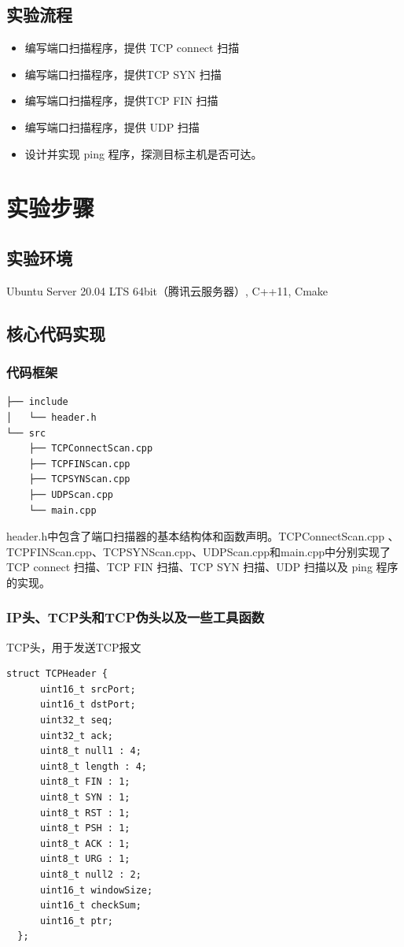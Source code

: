 \documentclass[UTF8,a4paper,10pt]{ctexart}
\begin{document}
\subsection{实验流程}
\begin{itemize}
    \item 编写端口扫描程序，提供 TCP connect 扫描
    \item 编写端口扫描程序，提供TCP SYN 扫描
    \item 编写端口扫描程序，提供TCP FIN 扫描
    \item 编写端口扫描程序，提供 UDP 扫描
    \item 设计并实现 ping 程序，探测目标主机是否可达。
\end{itemize}


\section{实验步骤}
\subsection{实验环境}
Ubuntu Server 20.04 LTS 64bit（腾讯云服务器）, C++11, Cmake
\subsection{核心代码实现}
\subsubsection{代码框架}
\begin{lstlisting}
├── include
│   └── header.h
└── src
    ├── TCPConnectScan.cpp
    ├── TCPFINScan.cpp
    ├── TCPSYNScan.cpp
    ├── UDPScan.cpp
    └── main.cpp
\end{lstlisting}
header.h中包含了端口扫描器的基本结构体和函数声明。TCPConnectScan.cpp
、TCPFINScan.cpp、TCPSYNScan.cpp、UDPScan.cpp和main.cpp中分别实现了 TCP connect 扫描、TCP FIN 扫描、TCP SYN 扫描、UDP 扫描以及 ping 程序的实现。

\subsubsection{IP头、TCP头和TCP伪头以及一些工具函数}
TCP头，用于发送TCP报文
\begin{lstlisting}
struct TCPHeader {
      uint16_t srcPort;
      uint16_t dstPort;
      uint32_t seq;
      uint32_t ack;
      uint8_t null1 : 4;
      uint8_t length : 4;
      uint8_t FIN : 1;
      uint8_t SYN : 1;
      uint8_t RST : 1;
      uint8_t PSH : 1;
      uint8_t ACK : 1;
      uint8_t URG : 1;
      uint8_t null2 : 2;
      uint16_t windowSize;
      uint16_t checkSum;
      uint16_t ptr;
  };
\end{lstlisting}
\end{document}
